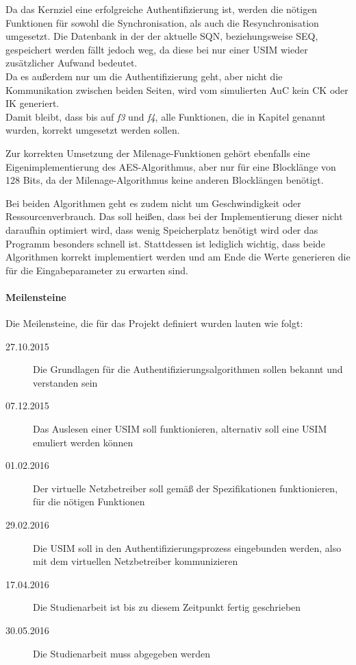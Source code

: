  Da das Kernziel eine erfolgreiche Authentifizierung ist, werden die nötigen Funktionen
 für sowohl die Synchronisation, als auch die Resynchronisation umgesetzt. Die Datenbank
 in der der aktuelle SQN, beziehungsweise SEQ, gespeichert werden fällt jedoch weg, da
 diese bei nur einer USIM wieder zusätzlicher Aufwand bedeutet. \\
 Da es außerdem nur um die Authentifizierung geht, aber nicht die Kommunikation zwischen
 beiden Seiten, wird vom simulierten AuC kein CK oder IK generiert. \\
 Damit bleibt, dass bis auf \emph{f3} und \emph{f4}, alle Funktionen, die in Kapitel 
 genannt wurden, korrekt umgesetzt werden sollen.
 
 Zur korrekten Umsetzung der Milenage-Funktionen gehört ebenfalls eine Eigen\-implementierung
 des AES-Algorithmus, aber nur für eine Blocklänge von 128 Bits, da der Milenage-Algorithmus
 keine anderen Blocklängen benötigt.
 
 Bei beiden Algorithmen geht es zudem nicht um Geschwindigkeit oder Ressourcenverbrauch.
 Das soll heißen, dass bei der Implementierung dieser nicht daraufhin optimiert wird, dass wenig
 Speicherplatz benötigt wird oder das Programm besonders schnell ist. Stattdessen ist lediglich
 wichtig, dass beide Algorithmen korrekt implementiert werden und am Ende die Werte generieren
 die für die Eingabeparameter zu erwarten sind.
 
 \paragraph{Meilensteine} Die Meilensteine, die für das Projekt definiert wurden lauten wie folgt:
 \begin{description}
 \item [27.10.2015] Die Grundlagen für die Authentifizierungs\-algorithmen sollen bekannt und verstanden sein
 \item [07.12.2015] Das Auslesen einer USIM soll funktionieren, alternativ soll eine USIM emuliert werden können
 \item [01.02.2016] Der virtuelle Netzbetreiber soll gemäß der Spezifikationen funktionieren, für die nötigen Funktionen
 \item [29.02.2016] Die USIM soll in den Authentifizierungsprozess eingebunden werden, also mit dem virtuellen Netzbetreiber kommunizieren
 \item [17.04.2016] Die Studienarbeit ist bis zu diesem Zeitpunkt fertig geschrieben
 \item [30.05.2016] Die Studienarbeit muss abgegeben werden
 \end{description}
 
